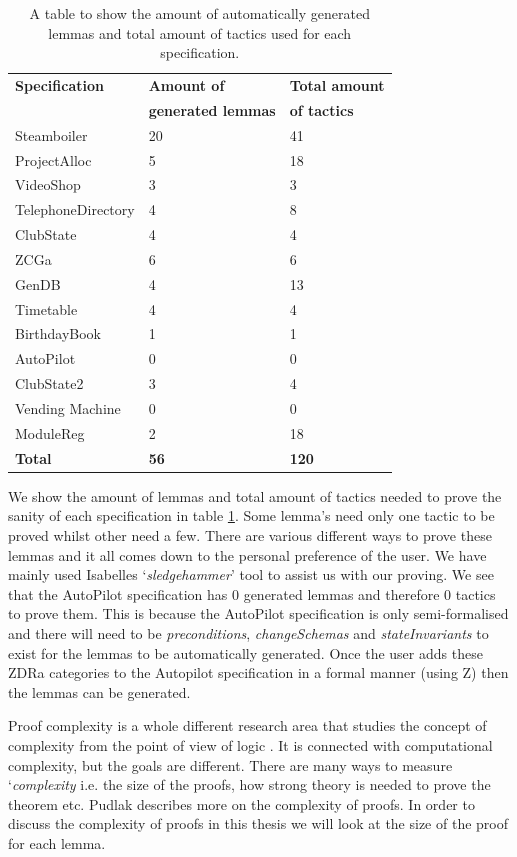 \begin{table}[H]
\begin{tabular}{|l | l | l |}
\hline
\textbf{Specification} & \textbf{Amount of} & \textbf{Total amount} \\
& \textbf{generated lemmas} & \textbf{of tactics} \\
\hline
Steamboiler & 20 & 41 \\
ProjectAlloc & 5 & 18 \\
VideoShop & 3 & 3 \\
TelephoneDirectory & 4 & 8 \\
ClubState & 4 & 4 \\
ZCGa & 6 & 6 \\
GenDB & 4 & 13 \\
Timetable & 4 & 4 \\
BirthdayBook & 1 & 1\\
AutoPilot & 0 & 0 \\
ClubState2 & 3 & 4 \\
Vending Machine & 0 & 0 \\
ModuleReg & 2 & 18 \\
\hline
\textbf{Total} & \textbf{56} & \textbf{120}\\
\hline
\end{tabular}
\caption{A table to show the amount of automatically generated lemmas and total amount of tactics used for each specification. \label{tab:lemmatact}}
\end{table}

We show the amount of lemmas and total amount of tactics needed to prove the
sanity of each specification in table \ref{tab:lemmatact}. Some lemma's need
only one tactic to be proved whilst other need a few. There are various
different ways to prove these lemmas and it all comes down to the personal
preference of the user. We have mainly used Isabelles `\emph{sledgehammer}' tool
to assist us with our proving.
We see that the AutoPilot specification has 0 generated lemmas and therefore 0
tactics to prove them. This is because the AutoPilot specification is only
semi-formalised and there will need to be \textit{preconditions}, \textit{changeSchemas} and
\textit{stateInvariants} to exist for the lemmas to be automatically generated.
Once the user adds these ZDRa categories to the Autopilot specification in a
formal manner (using Z) then the lemmas can be generated.

Proof complexity is a whole different research area that studies the concept of
complexity from the point of view of logic \cite{complexityofproofs}. It is connected with
computational complexity, but the goals are different. There are many ways to
measure `\textit{complexity} i.e. the size of the proofs, how strong theory is
needed to prove the theorem etc. Pudlak \cite{complexityofproofs} describes more on the
complexity of proofs. In order to discuss the complexity of proofs in this
thesis we will look at the size of the proof for each lemma.


